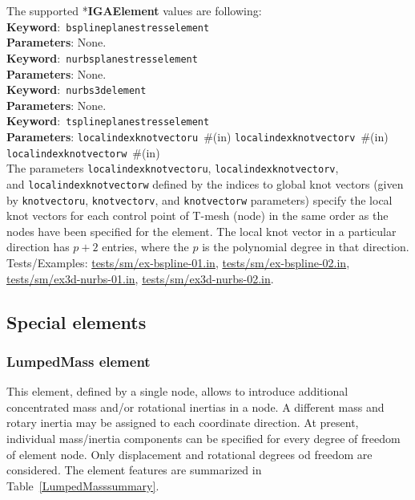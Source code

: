 \documentclass[a4paper]{article}
\newcommand{\descitem}[1]{{\noindent \textbf{#1}}:}
\newcommand{\elemkeyword}[1]{\descitem{Keyword}~\param{#1}} %
\newcommand{\param}[1]{\texttt{#1}} %
\newcommand{\field}[2]{\param{#1}~\#{\tiny(#2)}} %
\newcommand{\entKeyword}[1]{*\textbf{#1}} %
\begin{document}
The supported \entKeyword{IGAElement} values are following:\\
\elemkeyword{bsplineplanestresselement}\\
\descitem{Parameters} None.\\
\elemkeyword{nurbsplanestresselement}\\
\descitem{Parameters} None.\\
\elemkeyword{nurbs3delement}\\
\descitem{Parameters} None.\\
\elemkeyword{tsplineplanestresselement}\\
\descitem{Parameters} \field{localindexknotvectoru}{in} \field{localindexknotvectorv}{in} \field{localindexknotvectorw}{in}\\
The parameters \param{localindexknotvectoru}, \param{localindexknotvectorv},\\ and \param{localindexknotvectorw} defined by the indices to global knot vectors (given by \param{knotvectoru}, \param{knotvectorv}, and \param{knotvectorw} parameters) specify the local knot vectors for each control point of T-mesh (node) in the same order as the nodes have been specified for the element. The local knot vector in a particular direction has $p+2$ entries, where the $p$ is the polynomial degree in that direction.\\

Tests/Examples: \href{https://github.com/oofem/oofem/blob/devel/tests/sm/ex-bspline-01.in}{tests/sm/ex-bspline-01.in},
\href{https://github.com/oofem/oofem/blob/devel/tests/sm/ex-bspline-02.in}{tests/sm/ex-bspline-02.in},
\href{https://github.com/oofem/oofem/blob/devel/tests/sm/ex3d-nurbs-01.in}{tests/sm/ex3d-nurbs-01.in},
\href{https://github.com/oofem/oofem/blob/devel/tests/sm/ex3d-nurbs-02.in}{tests/sm/ex3d-nurbs-02.in}.

\clearpage
\subsection{Special elements}
\subsubsection{LumpedMass element}
This element, defined by a single node, allows to introduce additional concentrated mass and/or rotational inertias in a node.
A different mass and rotary inertia may be assigned to each coordinate direction. At present, individual mass/inertia components can be specified for  every degree of freedom of element node. Only displacement and rotational degrees od freedom are considered.  The element features are summarized in Table~\ref{LumpedMasssummary}.
\end{document}
